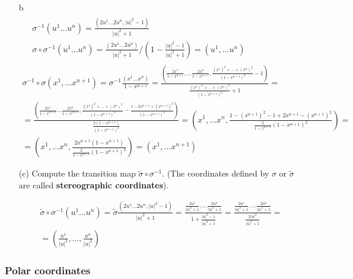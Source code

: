 \documentclass[10pt]{amsart}
\begin{document}
\begin{multicols*}{2}
\begin{enumerate}
\item[b]
\[
\begin{gathered}
\begin{aligned}
	& \sigma^{-1} (u^1 \dots u^n) = \frac{(2u^1 \dots 2u^n, |u|^2 - 1) }{ |u|^2 + 1 } \\
	& \sigma \circ \sigma^{-1}(u^1 \dots u^n) = \frac{ (2u^1 \dots 2u^n) }{ |u|^2 + 1 } / \left( 1 - \frac{ |u|^2 - 1 }{ |u|^2 + 1 } \right) = (u^1, \dots u^n)
\end{aligned}	\\
\sigma^{-1} \circ \sigma(x^1, \dots x^{n+1}) = \sigma^{-1} \frac{ (x^1 \dots x^n) }{ 1 - x^{n+1} } = \frac{ \left(\frac{ 2 x^1}{ 1 - x^{n+1} } , \dots \frac{2x^n}{1 - x^{n+1} } , \frac{ (x^1)^2 + \dots + (x^n)^2 }{ ( 1- x^{n+1})^2 } - 1 \right) }{ \frac{ (x^1)^2 + \dots + (x^n)^2}{ (1- x^{n+1})^2 } + 1 } = \\
= \frac{ \left( \frac{ 2 x^1}{ 1 - x^{n+1}} \dots \frac{2x^n}{1- x^{n+1}} , \frac{ (x^1)^2 + \dots + (x^n)^2 }{ (1-x^{n+1})^2} - \frac{ 1 - 2x^{n+1} + (x^{n+1})^2 }{ (1- x^{n+1})^2} \right) }{ \frac{2(1-x^{n+1})}{(1-x^{n+1})^2} } = \left( x^1, \dots x^n , \frac{ 1 - (x^{n+1})^2 - 1 + 2x^{n+1} - (x^{n+1})^2 }{ \frac{ 2 }{ 1 - x^{n+1}} (1- x^{n+1})^2 } \right) = \\
= (x^1, \dots x^n , \frac{2 x^{n+1} ( 1 -x^{n+1}) }{ \frac{ 2 }{ 1 - x^{n+1}} ( 1 - x^{n+1})^2 } ) = (x^1, \dots x^{n+1})
\end{gathered}
\]
\item[(c)] Compute the transition map $\widetilde{\sigma} \circ \sigma^{-1}$. (The coordinates defined by $\sigma$ or $\widetilde{\sigma}$ are called \textbf{stereographic coordinates}).

\[
\begin{gathered}
	\widetilde{\sigma} \circ \sigma^{-1}(u^1 \dots u^n) = \widetilde{\sigma} \frac{(2u^1 \dots 2u^n, |u|^2-1) }{ |u|^2 +  1} = \frac{ \frac{2u^1}{ |u|^2 + 1} , \dots \frac{2u^n}{ |u|^2 + 1} }{ 1 + \frac{ |u|^2 - 1 }{ |u|^2 + 1} } = \frac{ \frac{2u^1}{ |u|^2 + 1} , \dots \frac{2u^n}{ |u|^2 + 1} }{  \frac{2|u|^2}{ |u|^2 + 1} } = \\
	= \boxed{ \left( \frac{u^1}{ |u|^2} , \dots , \frac{u^n}{ |u|^2} \right) }
\end{gathered}
\]

\end{enumerate}

\subsubsection{Polar coordinates}


\end{multicols*}
\end{document}
